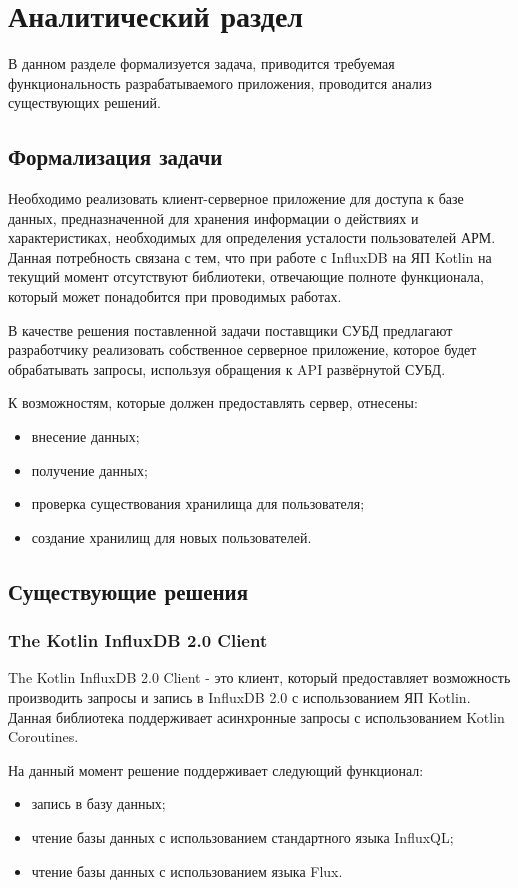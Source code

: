 \section{Аналитический раздел}

В данном разделе формализуется задача, приводится требуемая функциональность разрабатываемого приложения, проводится анализ существующих решений.

\subsection{Формализация задачи}
Необходимо реализовать клиент-серверное приложение для доступа к базе данных, предназначенной для хранения информации о действиях и характеристиках, необходимых для определения усталости пользователей АРМ. Данная потребность связана с тем, что при работе с InfluxDB на ЯП Kotlin на текущий момент отсутствуют библиотеки, отвечающие полноте функционала, который может понадобится при проводимых работах.

В качестве решения поставленной задачи поставщики СУБД предлагают разработчику реализовать собственное серверное приложение, которое будет обрабатывать запросы, используя обращения к API развёрнутой СУБД.

К возможностям, которые должен предоставлять сервер, отнесены:
\begin{itemize}[leftmargin=1.6\parindent]
\item внесение данных;
\item получение данных;
\item проверка существования хранилища для пользователя;
\item создание хранилищ для новых пользователей.
\end{itemize}

\subsection{Существующие решения}
\subsubsection{The Kotlin InfluxDB 2.0 Client}
The Kotlin InfluxDB 2.0 Client \cite{influxClient} - это клиент, который предоставляет возможность производить запросы и запись в InfluxDB 2.0 с использованием ЯП Kotlin. Данная библиотека поддерживает асинхронные запросы с использованием Kotlin Coroutines.

На данный момент решение поддерживает следующий функционал:
\begin{itemize}[leftmargin=1.6\parindent]
\item запись в базу данных;
\item чтение базы данных с использованием стандартного языка InfluxQL;
\item чтение базы данных с использованием языка Flux.
\end{itemize}

